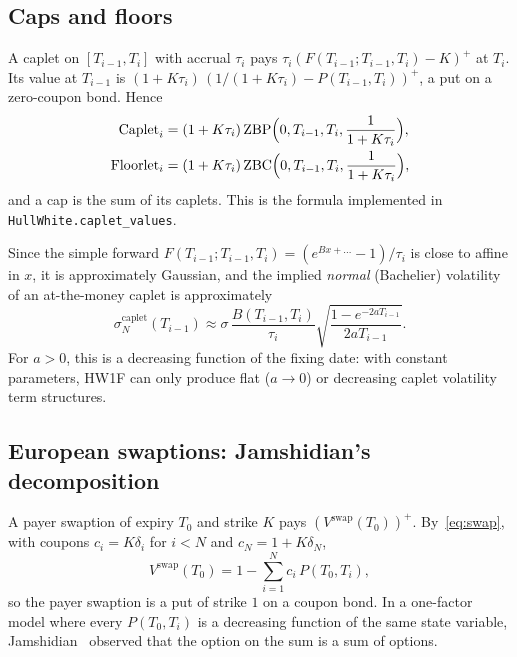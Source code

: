 \documentclass[11pt,a4paper]{article}
\theoremstyle{plain}
\theoremstyle{definition}
\begin{document}
\subsection{Caps and floors}
A caplet on $[T_{i-1},T_i]$ with accrual $\tau_i$ pays $\tau_i(F(T_{i-1};T_{i-1},T_i)-K)^+$ at $T_i$. Its value at $T_{i-1}$ is $(1+K\tau_i)\,(1/(1+K\tau_i)-P(T_{i-1},T_i))^+$, a put on a zero-coupon bond. Hence
\begin{equation}
\begin{aligned}
    \mathrm{Caplet}_i&=(1+K\tau_i)\,\mathrm{ZBP}\Bigl(0,T_{i-1},T_i,\frac{1}{1+K\tau_i}\Bigr),\\
    \mathrm{Floorlet}_i&=(1+K\tau_i)\,\mathrm{ZBC}\Bigl(0,T_{i-1},T_i,\frac{1}{1+K\tau_i}\Bigr),
\end{aligned}
    \label{eq:caplet}
\end{equation}
and a cap is the sum of its caplets. This is the formula implemented in \texttt{HullWhite.caplet\_values}.

Since the simple forward $F(T_{i-1};T_{i-1},T_i)=(e^{B x+\dots}-1)/\tau_i$ is close to affine in $x$, it is approximately Gaussian, and the implied \emph{normal} (Bachelier) volatility of an at-the-money caplet is approximately
\begin{equation}
    \sigma_N^{\text{caplet}}(T_{i-1})\approx\sigma\,\frac{B(T_{i-1},T_i)}{\tau_i}\sqrt{\frac{1-e^{-2aT_{i-1}}}{2aT_{i-1}}}.
    \label{eq:caplet-vol}
\end{equation}
For $a>0$, this is a decreasing function of the fixing date: with constant parameters, HW1F can only produce flat ($a\to0$) or decreasing caplet volatility term structures.

\subsection{European swaptions: Jamshidian's decomposition}
A payer swaption of expiry $T_0$ and strike $K$ pays $(V^{\text{swap}}(T_0))^+$. By~\eqref{eq:swap}, with coupons $c_i=K\delta_i$ for $i<N$ and $c_N=1+K\delta_N$,
\begin{equation}
    V^{\text{swap}}(T_0)=1-\sum_{i=1}^Nc_i\,P(T_0,T_i),
\end{equation}
so the payer swaption is a put of strike $1$ on a coupon bond. In a one-factor model where every $P(T_0,T_i)$ is a decreasing function of the same state variable, Jamshidian~\cite{jamshidian} observed that the option on the sum is a sum of options.
\end{document}
